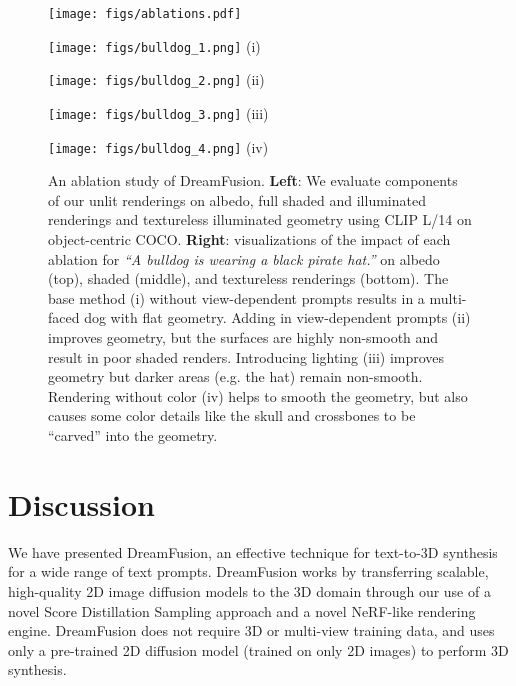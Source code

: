 \documentclass{article} \usepackage{iclr2023_conference,times}
\newcommand{\sname}{Score Distillation Sampling\xspace}
\newcommand{\dreamfusion}{DreamFusion\xspace}
\begin{document}
\newcommand{\barwidth}{0.55\linewidth}
\newcommand{\bulldogwidth}{0.11\linewidth}
\newcommand{\qualablationcaption}[1]{{\footnotesize #1}}
\begin{figure}[t!]
    \begin{minipage}[c]{\barwidth}
        \centering
        \texttt{[image: figs/ablations.pdf]}
    \end{minipage}\hfill
    \begin{minipage}[c]{\bulldogwidth}
        \centering
        \texttt{[image: figs/bulldog\_1.png]}
        \qualablationcaption{(i)}
    \end{minipage}\hfill
    \begin{minipage}[c]{\bulldogwidth}
        \centering
        \texttt{[image: figs/bulldog\_2.png]}
        \qualablationcaption{(ii)}
    \end{minipage}\hfill
    \begin{minipage}[c]{\bulldogwidth}
        \centering
        \texttt{[image: figs/bulldog\_3.png]}
        \qualablationcaption{(iii)}
    \end{minipage}\hfill
    \begin{minipage}[c]{\bulldogwidth}
        \centering
        \texttt{[image: figs/bulldog\_4.png]}
        \qualablationcaption{(iv)}
    \end{minipage}
    \caption{An ablation study of \dreamfusion. {\bf Left}: We evaluate components of our unlit renderings on albedo, full shaded and illuminated renderings and textureless illuminated geometry using CLIP L/14 on object-centric COCO. {\bf Right}: visualizations of the impact of each ablation for  \textit{\footnotesize ``A bulldog is wearing a black pirate hat.''} on albedo (top), shaded (middle), and textureless renderings (bottom). The base method (i) without view-dependent prompts results in a multi-faced dog with flat geometry. Adding in view-dependent prompts (ii) improves geometry, but the surfaces are highly non-smooth and result in poor shaded renders. Introducing lighting (iii) improves geometry but darker areas (e.g. the hat) remain non-smooth. Rendering without color (iv) helps to smooth the geometry, but also causes some color details like the skull and crossbones to be ``carved'' into the geometry.}
    \label{fig:ablation_bar}
    \label{fig:ablation_qualitative}
\end{figure}

\section{Discussion}
We have presented \dreamfusion{}, an effective technique for text-to-3D synthesis for a wide range of text prompts.
\dreamfusion{} works by transferring scalable, high-quality 2D image diffusion models to the 3D domain through our use of a novel \sname approach and a novel NeRF-like rendering engine. \dreamfusion{} does not require 3D or multi-view training data, and uses only a pre-trained 2D diffusion model (trained on only 2D images) to perform 3D synthesis.
\end{document}

